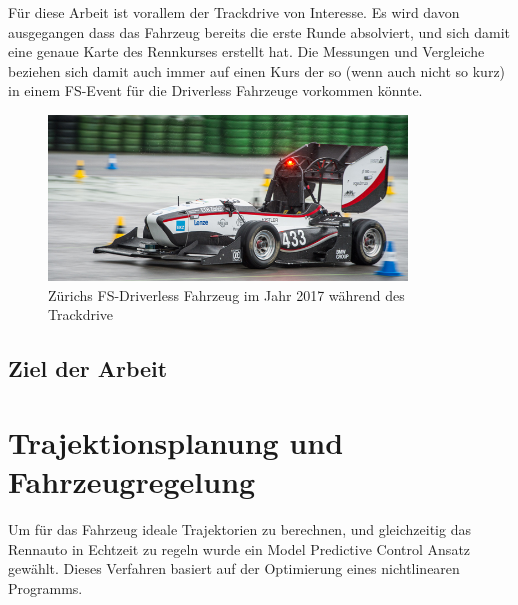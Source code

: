 \documentclass{like}
\begin{document}
Für diese Arbeit ist vorallem der Trackdrive von Interesse. Es wird davon ausgegangen dass das Fahrzeug bereits die erste Runde absolviert, und sich damit eine genaue Karte des Rennkurses erstellt hat. Die Messungen und Vergleiche beziehen sich damit auch immer auf einen Kurs der so (wenn auch nicht so kurz) in einem FS-Event für die Driverless Fahrzeuge vorkommen könnte.
 
\begin{figure}[hb!]
	\centering
	\includegraphics[width=270pt]{Abbildungen/amz-driverless-long.jpg}
	\caption{Zürichs FS-Driverless Fahrzeug im Jahr 2017 während des Trackdrive}
\end{figure}

\section{Ziel der Arbeit}



\chapter{Trajektionsplanung und Fahrzeugregelung}

Um für das Fahrzeug ideale Trajektorien zu berechnen, und gleichzeitig das Rennauto in Echtzeit zu regeln wurde ein Model Predictive Control Ansatz gewählt. Dieses Verfahren basiert auf der Optimierung eines nichtlinearen Programms.

 
 
\end{document}
